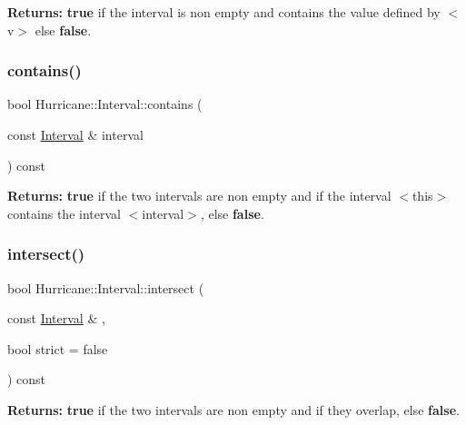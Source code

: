 {\bfseries Returns\+:} {\bfseries true} if the interval is non empty and contains the value defined by {\ttfamily $<$v$>$} else {\bfseries false}. \mbox{\label{classHurricane_1_1Interval_af613eb138f2035f50cba47057a074b2e}} 
\subsubsection{\texorpdfstring{contains()}{contains()}\hspace{0.1cm}{\footnotesize\ttfamily [2/2]}}
{\footnotesize\ttfamily bool Hurricane\+::\+Interval\+::contains (\begin{DoxyParamCaption}\item[{const \mbox{\hyperlink{classHurricane_1_1Interval}{Interval}} \&}]{interval }\end{DoxyParamCaption}) const}

{\bfseries Returns\+:} {\bfseries true} if the two intervals are non empty and if the interval {\ttfamily $<$this$>$} contains the interval {\ttfamily $<$interval$>$}, else {\bfseries false}. \mbox{\label{classHurricane_1_1Interval_af4862b82fe5b37cdb3986a3b05245469}} 
\subsubsection{\texorpdfstring{intersect()}{intersect()}}
{\footnotesize\ttfamily bool Hurricane\+::\+Interval\+::intersect (\begin{DoxyParamCaption}\item[{const \mbox{\hyperlink{classHurricane_1_1Interval}{Interval}} \&}]{,  }\item[{bool}]{strict = {\ttfamily false} }\end{DoxyParamCaption}) const}

{\bfseries Returns\+:} {\bfseries true} if the two intervals are non empty and if they overlap, else {\bfseries false}. \mbox{\label{classHurricane_1_1Interval_a1e171021dcd5c0dc7e8afb0b2324c5ee}} 
